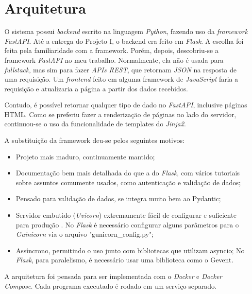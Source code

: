 \chapter{Arquitetura}

O sistema possui \textit{backend} escrito na linguagem \textit{Python}, 
fazendo uso da 
\textit{framework \textit{FastAPI}}. Até a entrega do Projeto I, o backend era feito em \textit{Flask}. 
A escolha foi feita pela familiaridade com a framework. Porém, depois, 
descobriu-se a framework \textit{FastAPI} no meu trabalho. Normalmente, ela não é usada para 
\textit{fullstack}, mas sim para fazer \textit{APIs REST}, que retornam \textit{JSON} na resposta de uma 
requisição. Um \textit{frontend} feito em alguma framework de \textit{JavaScript} faria a requisição
 e atualizaria a página a partir dos dados recebidos.

Contudo, é possível retornar qualquer tipo de dado no \textit{\textit{FastAPI}}, inclusive páginas 
HTML. Como se preferiu fazer a renderização de páginas no lado do servidor, continuou-se
o uso da funcionalidade de templates do \textit{\textit{Jinja2}}.

A substituição da framework deu-se pelos seguintes motivos:

\begin{itemize}
\item Projeto mais maduro, continuamente mantido;
\item Documentação bem mais detalhada do que a do \textit{Flask}, com vários tutoriais sobre assuntos comumente usados, como autenticação e validação de dados;
\item Pensado para validação de dados, se integra muito bem ao Pydantic;
\item Servidor embutido (\textit{\textit{Uvicorn}}) extremamente fácil de configurar e suficiente para produção \cite{fast-api-prod}.
No \textit{Flask} é necessário configurar alguns parâmetros para o \textit{Guinicorn} via o arquivo "gunicorn\_config.py";
\item Assíncrono, permitindo o uso junto com bibliotecas que utilizam asyncio;
No \textit{Flask}, para paralelismo, é necessário usar uma biblioteca como o Gevent.
\end{itemize}

A arquitetura foi pensada para ser implementada com o \textit{\textit{Docker}} e \textit{\textit{Docker} Compose}. Cada
programa executado é rodado em um serviço separado.

